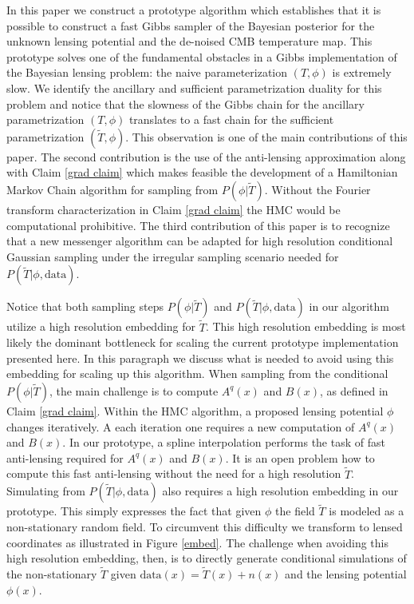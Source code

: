 \documentclass[iop,revtex4,apj,onecolumn]{emulateapj}
\begin{document}
In this paper we construct a prototype algorithm which establishes that it is possible to construct a fast Gibbs sampler of the Bayesian posterior for the unknown lensing potential and the de-noised CMB temperature map. This prototype solves one of the fundamental obstacles in a Gibbs implementation of the Bayesian lensing problem: the naive parameterization $(T, \phi)$ is extremely slow. We identify the ancillary and sufficient parametrization duality for this problem and notice that the slowness of the Gibbs chain for the ancillary parametrization  $(T, \phi)$ translates to a fast chain for the sufficient parametrization  $(\widetilde T, \phi)$. This observation is one of the main contributions of this paper. The second contribution is the use of the anti-lensing approximation along with Claim \ref{grad claim} which makes feasible the development of a Hamiltonian Markov Chain algorithm for sampling from  $P(\phi | \widetilde T)$. Without the Fourier transform characterization in Claim \ref{grad claim} the HMC would be computational prohibitive. The third contribution of this paper is to recognize that a new messenger algorithm \cite{elsner2013efficient,jasche2014matrix} can be adapted for high resolution conditional Gaussian sampling under the irregular sampling scenario needed for $P(\widetilde T|\phi, \text{data})$.  


Notice that both sampling steps $P(\phi |\widetilde T)$ and $P(\widetilde T|\phi, \text{data})$ in our algorithm utilize a high resolution embedding for $\widetilde T$. This high resolution embedding is most likely the dominant bottleneck for scaling the current prototype implementation presented here.  In this paragraph we discuss what is needed to avoid using this embedding for scaling up this algorithm. When sampling from the conditional $P(\phi |\widetilde T)$, the main challenge is to compute $A^q(x)$ and $B(x)$, as defined in Claim  \ref{grad claim}.  Within the HMC algorithm, a proposed lensing potential $\phi$ changes iteratively. A each iteration  one requires a new computation of $A^q(x)$ and $B(x)$. In our prototype, a spline interpolation performs the task of fast anti-lensing required for  $A^q(x)$ and $B(x)$. It is an open problem how to compute this fast anti-lensing without the need for a high resolution $\widetilde T$. Simulating from $P(\widetilde T|\phi, \text{data})$ also requires a high resolution embedding in our prototype. This simply expresses the fact that given $\phi$ the field $\widetilde T$ is modeled as a non-stationary random field. To circumvent this difficulty we  transform to lensed coordinates as illustrated in Figure \ref{embed}. The challenge when avoiding this high resolution embedding, then, is to directly generate conditional simulations of the non-stationary $\widetilde T$ given $\text{data}(x)=\widetilde T(x)+ n(x)$ and the lensing potential $\phi(x)$. 
\end{document}
